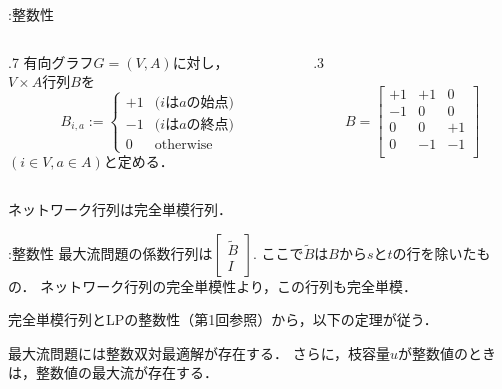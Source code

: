 \documentclass[14pt,aspectratio=169,xcolor=dvipsnames,table,onlytextwidth,dvipdfmx]{beamer}
\begin{document}
\begin{frame}{\insertsection :整数性}
    \small
    \begin{columns}
    \begin{column}{.7\textwidth}
     有向グラフ$G = (V, A)$に対し，\\ 
    $V \times A$行列$B$を
    \[
        B_{i,a} := \begin{cases}
            +1 & \text{($i$は$a$の始点)} \\
            -1 & \text{($i$は$a$の終点)} \\
            0  & \text{otherwise}
        \end{cases} 
    \]
    $(i \in V, a \in A)$と定める．
    \end{column}
    \begin{column}{.3\textwidth}
        \centering
        \[
            B = \begin{bmatrix}
                +1 & +1 & 0 \\
                -1 & 0 & 0 \\
                0 & 0 & +1 \\
                0 & -1 & -1 \\
            \end{bmatrix}
        \]
    \end{column}
    \end{columns}

    \bigskip
    \begin{lemma}
        ネットワーク行列は\alert{完全単模行列}．
    \end{lemma}
\end{frame}

\begin{frame}{\insertsection :整数性}
    最大流問題の係数行列は$
        \begin{bmatrix}
            \tilde B \\
            I
        \end{bmatrix}$. ここで$\tilde B$は$B$から$s$と$t$の行を除いたもの．
    ネットワーク行列の完全単模性より，この行列も完全単模．

    \vfill
    完全単模行列とLPの整数性（第1回参照）から，以下の定理が従う．

    \begin{theorem}
        最大流問題には整数双対最適解が存在する．
        さらに，枝容量$u$が整数値のときは，整数値の最大流が存在する．
    \end{theorem}

\end{frame}
\end{document}

